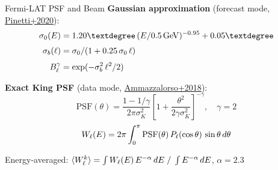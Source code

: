\begin{frame}{Fermi-LAT PSF and Beam}
\textbf{Gaussian approximation} (forecast mode, \href{https://arxiv.org/abs/1911.04989}{Pinetti+2020}):
\begin{align}
\sigma_0(E) &= 1.20°\,(E/0.5\GeV)^{-0.95} + 0.05° \\[3pt]
\sigma_b(\ell) &= \sigma_0 / (1 + 0.25\,\sigma_0\,\ell) \\[3pt]
\Bell^\gamma &= \exp(-\sigma_b^2\,\ell^2/2)
\end{align}

\textbf{Exact King PSF} (data mode, \href{https://arxiv.org/abs/1808.09225}{Ammazzalorso+2018}):
\begin{equation}
\mathrm{PSF}(\theta) = \frac{1-1/\gamma}{2\pi\sigma_K^2}\left[1 + \frac{\theta^2}{2\gamma\sigma_K^2}\right]^{-\gamma}, \quad \gamma = 2
\end{equation}
\begin{equation}
W_\ell(E) = 2\pi\int_0^\pi \mathrm{PSF}(\theta)\,P_\ell(\cos\theta)\,\sin\theta\,d\theta
\end{equation}

Energy-averaged: $\langle W_\ell^k\rangle = \int W_\ell(E)\,E^{-\alpha}\,dE\;/\;\int E^{-\alpha}\,dE$, \quad $\alpha=2.3$
\end{frame}
